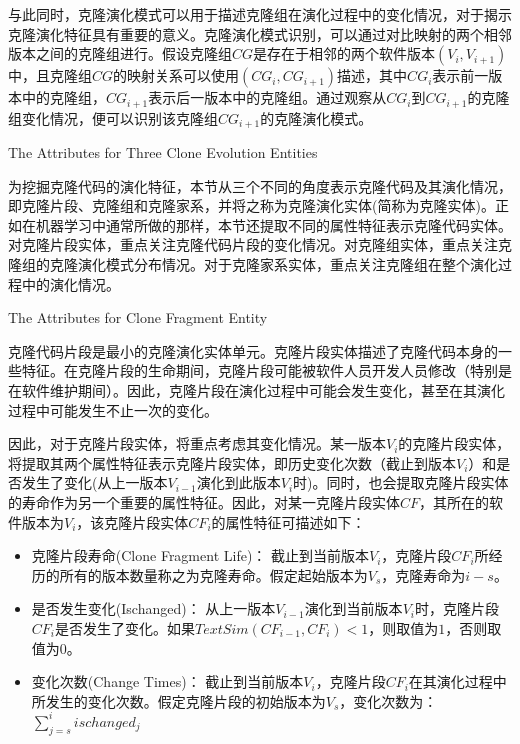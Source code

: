 与此同时，克隆演化模式可以用于描述克隆组在演化过程中的变化情况，对于揭示克隆演化特征具有重要的意义。克隆演化模式识别，可以通过对比映射的两个相邻版本之间的克隆组进行。假设克隆组$CG$是存在于相邻的两个软件版本{$(V_i,V_{i+1})$}中，且克隆组$CG$的映射关系可以使用{$(CG_i, CG_{i+1})$}描述，其中{$CG_i$}表示前一版本中的克隆组，{$CG_{i+1}$}表示后一版本中的克隆组。通过观察从{$CG_i$}到{$CG_{i+1}$}的克隆组变化情况，便可以识别该克隆组{$CG_{i+1}$}的克隆演化模式。

{The Attributes for Three Clone Evolution Entities}

为挖掘克隆代码的演化特征，本节从三个不同的角度表示克隆代码及其演化情况，即克隆片段、克隆组和克隆家系，并将之称为克隆演化实体(简称为克隆实体)。正如在机器学习中通常所做的那样，本节还提取不同的属性特征表示克隆代码实体。对克隆片段实体，重点关注克隆代码片段的变化情况。对克隆组实体，重点关注克隆组的克隆演化模式分布情况。对于克隆家系实体，重点关注克隆组在整个演化过程中的演化情况。

{The Attributes for Clone Fragment Entity}

克隆代码片段是最小的克隆演化实体单元。克隆片段实体描述了克隆代码本身的一些特征。在克隆片段的生命期间，克隆片段可能被软件人员开发人员修改（特别是在软件维护期间）。因此，克隆片段在演化过程中可能会发生变化，甚至在其演化过程中可能发生不止一次的变化。

因此，对于克隆片段实体，将重点考虑其变化情况。某一版本$V_i$的克隆片段实体，将提取其两个属性特征表示克隆片段实体，即历史变化次数（截止到版本$V_i$）和是否发生了变化(从上一版本$V_{i-1}$演化到此版本$V_i$时)。同时，也会提取克隆片段实体的寿命作为另一个重要的属性特征。因此，对某一克隆片段实体$CF$，其所在的软件版本为$V_i$，该克隆片段实体$CF_i$的属性特征可描述如下：

\begin{itemize}
\item
克隆片段寿命(Clone Fragment Life)：
截止到当前版本$V_ i $，克隆片段$CF_i$所经历的所有的版本数量称之为克隆寿命。假定起始版本为$V_s$，克隆寿命为$i - s$。
\item
是否发生变化(Ischanged)：
从上一版本$V_{i-1} $演化到当前版本$V_ i $时，克隆片段$CF_i$是否发生了变化。如果$\mathit{TextSim}(CF_{i-1}, CF_{i}) < 1$，则取值为$1$，否则取值为$0$。
\item
变化次数(Change Times)：
截止到当前版本$V_ i $，克隆片段$CF_i$在其演化过程中所发生的变化次数。假定克隆片段的初始版本为$V_s$，变化次数为：$\sum_{j=s}^i{ischanged_j}$
\end{itemize}

